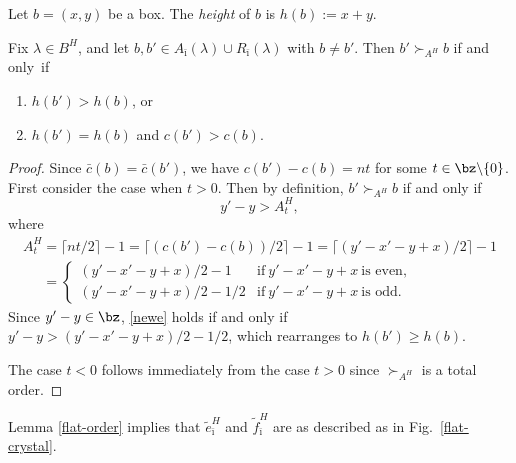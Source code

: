 \begin{Definition} Let $b=(x,y)$ be a box.
The \emph{height} of $b$ is $h(b):= x+y$.
\end{Definition}

\begin{Lemma} \label{flat-order} Fix $\lambda \in B^{H}$, and let $b, b' \in A_{\bar \imath}(\lambda) \cup R_{\bar \imath}(\lambda)$ with $b \neq b'$. Then $b' \succ_{A^H} b$ if and only~if
\begin{enumerate}\itemsep=0pt
\item $h(b') > h(b)$, or
\item  $h(b')= h(b)$ and $c(b') > c(b).$
\end{enumerate}
\end{Lemma}

\begin{proof} Since $\bar c(b) = \bar c(b')$, we have $c(b')-c(b)=nt$ for some $t \in \bz \backslash \{ 0 \}$. First consider the case when $t>0$. Then by def\/inition, $b' \succ_{A^H} b$ if and only if
\begin{equation} \label{newe}
y'-y> A^H_t,
\end{equation}
where
\begin{gather*}
A^H_t  =  \lceil nt/2 \rceil-1 =  \lceil (c(b')-c(b))/2 \rceil-1 = \lceil (y'-x'-y+x)/2 \rceil-1 \\
\phantom{A^H_t}{} = \begin{cases}
(y'-x'-y+x)/2 -1&  \text{if} \ y'-x'-y+x \ \text{is even}, \\
(y'-x'-y+x)/2 -1/2 &  \text{if} \ y'-x'-y+x \ \text{is odd}.
\end{cases}
\end{gather*}
Since $y'-y \in \bz$, \eqref{newe} holds if and only if
$y'-y > (y'-x'-y+x)/2 -1/2$, which rearranges to $h(b') \geq h(b)$.

The case $t<0$ follows immediately from the case $t>0$ since $\succ_{A^H}$ is a total order.
\end{proof}

Lemma \ref{flat-order} implies that $\tilde e_{\bar \imath}^{H}$ and $\tilde f_{\bar \imath}^{H}$ are as described as in Fig.~\ref{flat-crystal}.

